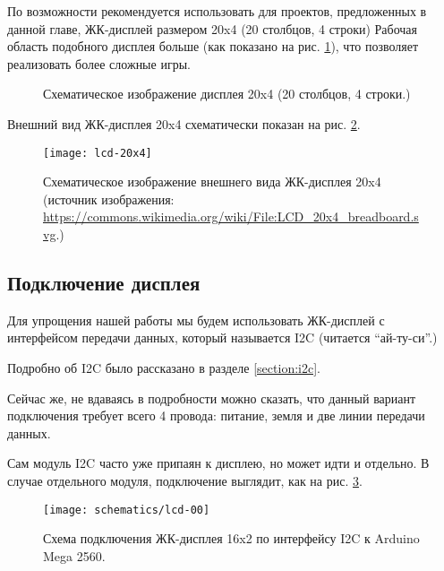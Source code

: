 \documentclass[../sparc.tex]{subfiles}
\begin{document}
По возможности рекомендуется использовать для проектов, предложенных в данной
главе, ЖК-дисплей размером 20x4 (20 столбцов, 4 строки) Рабочая область
подобного дисплея больше (как показано на рис. \ref{fig:lcd-20x4-schematics}),
что позволяет реализовать более сложные игры.

\begin{figure}[ht]
  \centering
  \caption{Схематическое изображение дисплея 20x4 (20 столбцов, 4 строки.)}
  \label{fig:lcd-20x4-schematics}
\end{figure}

Внешний вид ЖК-дисплея 20x4 схематически показан на рис. \ref{fig:lcd-20x4}.

\begin{figure}[h]
  \centering
  \texttt{[image: lcd-20x4]}
  \caption{Схематическое изображение внешнего вида ЖК-дисплея 20x4 (источник
    изображения:
    \url{https://commons.wikimedia.org/wiki/File:LCD_20x4_breadboard.svg}.)}
  \label{fig:lcd-20x4}
\end{figure}

\subsection{Подключение дисплея}

Для упрощения нашей работы мы будем использовать ЖК-дисплей с интерфейсом
передачи данных, который называется \gls{I2C} (читается ``ай-ту-си''.)

Подробно об I2C было рассказано в разделе \ref{section:i2c}.

Сейчас же, не вдаваясь в подробности можно сказать, что данный вариант
подключения требует всего 4 провода: питание, земля и две линии передачи данных.

Сам модуль I2C часто уже припаян к дисплею, но может идти и отдельно.  В случае
отдельного модуля, подключение выглядит, как на рис. \ref{fig:lcd-00}.

\begin{figure}[H]
  \centering
  \texttt{[image: schematics/lcd-00]}
  \caption{Схема подключения ЖК-дисплея 16x2 по интерфейсу I2C к Arduino Mega
    2560.}
  \label{fig:lcd-00}
\end{figure}
\end{document}
